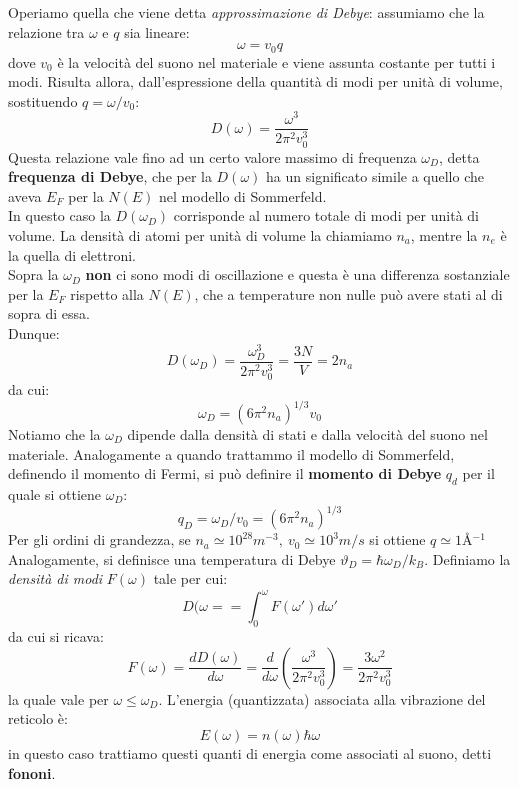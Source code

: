 \documentclass{book}
\begin{document}
            Operiamo quella che viene detta \textit{approssimazione di Debye}: assumiamo che la relazione tra $\omega$ e $q$ sia lineare:
            $$\omega  = v_{0}q$$
            dove $v_{0}$ è la velocità del suono nel materiale e viene assunta costante per tutti i modi. Risulta allora, dall'espressione della quantità di modi per unità di volume, sostituendo $q = \omega/v_{0}$:
            $$D (\omega) = \frac{\omega ^{3}}{2 \pi ^{2}v_{0}^{3}}$$
            Questa relazione vale fino ad un certo valore massimo di frequenza $\omega_{D}$, detta \textbf{frequenza di Debye}, che per la $D(\omega)$ ha un significato simile a quello che aveva $E_{F}$ per la $N(E)$ nel modello di Sommerfeld.\\
            In questo caso la $D(\omega_{D})$ corrisponde al numero totale di modi per unità di volume. La densità di atomi per unità di volume la chiamiamo $n_{a}$, mentre la $n_{e}$ è la quella di elettroni.\\
            Sopra la $\omega_{D}$ \textbf{non} ci sono modi di oscillazione e questa è una differenza sostanziale per la $E_{F}$ rispetto alla $N(E)$, che a temperature non nulle può avere stati al di sopra di essa.\\
            Dunque:
            $$D(\omega_{D}) = \frac{\omega_{D} ^{3}}{2 \pi^{2}v_{0} ^{3}} = \frac{3N}{V} = 2n_{a}$$
            da cui:
            $$\omega_{D} = (6 \pi^{2}n_{a})^{1/3}v_{0}$$
            Notiamo che la $\omega_{D}$ dipende dalla densità di stati e dalla velocità del suono nel materiale. Analogamente a quando trattammo il modello di Sommerfeld, definendo il momento di Fermi, si può definire il \textbf{momento di Debye} $q_{d}$ per il quale si ottiene $\omega_{D}$:
            $$q_{D} = \omega_{D}/v_{0} = (6 \pi^{2}n_{a})^{1/3}$$
            Per gli ordini di grandezza, se $n_{a} \simeq 10^{28}m^{-3}, \ v_{0} \simeq 10^{3}m/s$ si ottiene $q \simeq 1$\si{\angstrom}$^{-1}$
            Analogamente, si definisce una temperatura di Debye $\vartheta_{D} = \hbar \omega_{D}/k_{B}$.
            Definiamo la \textit{densità di modi} $F(\omega)$ tale per cui:
            $$D(\omega= = \int_{0} ^{\omega} F(\omega ')d \omega '$$
            da cui si ricava:
            $$F(\omega) = \frac{d D(\omega)}{d \omega} = \frac{d}{d\omega} (\frac{\omega ^{3}}{2 \pi^{2}v_{0}^{3}}) = \frac{3 \omega ^{2}}{2 \pi^{2}v_{0} ^{3}}$$
            la quale vale per $\omega \leq \omega_{D}$.
            L'energia (quantizzata) associata alla vibrazione del reticolo è:
            $$E(\omega ) = n(\omega) \hbar \omega$$
            in questo caso trattiamo questi quanti di energia come associati al suono, detti \textbf{fononi}.\\
\end{document}
